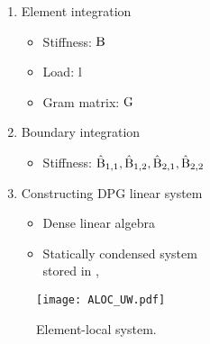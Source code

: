 \begin{minipage}{0.48\textwidth}
\begin{enumerate}
	\itemsep -10pt
	\item Element integration \vspace{-15pt}
	\begin{itemize}
		\itemsep -8pt
		\item Stiffness: $\mathrm{B}$
		\item Load: $\mathrm{l}$
		\item Gram matrix: $\mathrm{G}$
	\end{itemize}
	\item Boundary integration \vspace{-15pt}
	\begin{itemize}
		\itemsep -8pt
		\item Stiffness: $\mathrm{\hat B_{1,1}, \hat B_{1,2}, \hat B_{2,1}, \hat B_{2,2}}$
	\end{itemize}
	\item Constructing DPG linear system \vspace{-15pt}
	\begin{itemize}
		\itemsep -8pt
		\item Dense linear algebra
		\item {Statically condensed system\\[-5pt] 
		stored in , }
	\end{itemize}
\end{enumerate}
\end{minipage}%
\begin{minipage}{0.48\textwidth}
\begin{figure}[H]
	\centering
		\texttt{[image: ALOC\_UW.pdf]}
	\caption*{Element-local system.}
\end{figure}
\end{minipage}

